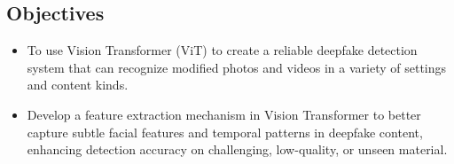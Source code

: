 \subsection{Objectives}
\justify
\begin{itemize}
    \item To use Vision Transformer (ViT) to create a reliable deepfake detection system that can recognize modified photos and videos in a variety of settings and content kinds.
    \item Develop a feature extraction mechanism in Vision Transformer to better capture subtle facial features and temporal patterns in deepfake content, enhancing detection accuracy on challenging, low-quality, or unseen material.
\end{itemize}
